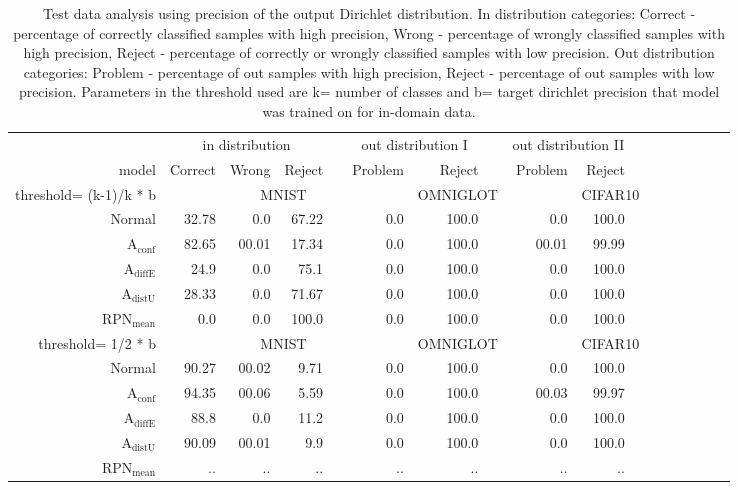\begin{table}[ht]
	\centering
	\caption{Test data analysis using precision of the output Dirichlet distribution. In distribution categories: Correct - percentage of correctly classified samples with high precision,
	Wrong - percentage of wrongly classified samples with high precision, Reject - percentage of correctly or wrongly classified samples with low precision. Out distribution categories:
	Problem - percentage of out samples with high precision, Reject - percentage of out samples with low precision. Parameters in the threshold used are k= number of classes and
	b= target dirichlet precision that model was trained on for in-domain data. }
	\begin{tiny}
        \begin{tabular}{@{}rrrrrrrcrrrrcrrrr@{}}
        \toprule
		& \multicolumn{3}{c}{in distribution} & & \multicolumn{2}{c}{out distribution I} & & \multicolumn{2}{c}{out distribution II} \\
		model & Correct & Wrong & Reject & &  Problem & Reject &  & Problem & Reject \\
        \midrule
		threshold= (k-1)/k * b & & \multicolumn{3}{c}{MNIST} & & \multicolumn{2}{c}{OMNIGLOT} & & \multicolumn{2}{c}{CIFAR10} \\
		Normal & 32.78 & 0.0 & 67.22 & & 0.0 & 100.0 && 0.0 & 100.0 \\
		$\mathrm{A}_{\mathrm{conf}}$ & 82.65 & 00.01 & 17.34 && 0.0 & 100.0 && 00.01 & 99.99 \\
		$\mathrm{A}_{\mathrm{diffE}}$ & 24.9 & 0.0 & 75.1 & & 0.0 & 100.0 & & 0.0 & 100.0 \\  
		$\mathrm{A}_{\mathrm{distU}}$ & 28.33 & 0.0 & 71.67 & & 0.0 & 100.0 & & 0.0 & 100.0 \\
		$\mathrm{RPN}_{\mathrm{mean}}$ & 0.0 & 0.0 & 100.0 & & 0.0 & 100.0 & & 0.0 & 100.0 \\
		\midrule
		threshold= 1/2 * b & & \multicolumn{3}{c}{MNIST} & & \multicolumn{2}{c}{OMNIGLOT} & & \multicolumn{2}{c}{CIFAR10} \\
		Normal & 90.27 & 00.02 & 9.71 & & 0.0 & 100.0 && 0.0 & 100.0 \\
		$\mathrm{A}_{\mathrm{conf}}$ & 94.35 & 00.06 & 5.59 && 0.0 & 100.0 && 00.03 & 99.97 \\
		$\mathrm{A}_{\mathrm{diffE}}$ & 88.8 & 0.0 & 11.2 & & 0.0 & 100.0 & & 0.0 & 100.0 \\  
		$\mathrm{A}_{\mathrm{distU}}$ & 90.09 & 00.01 & 9.9 & & 0.0 & 100.0 & & 0.0 & 100.0 \\
		$\mathrm{RPN}_{\mathrm{mean}}$ & .. & .. & .. & & .. & .. & & .. & .. \\
        \end{tabular}
	\end{tiny}
	\label{tab:precision based data analysis}
\end{table}







